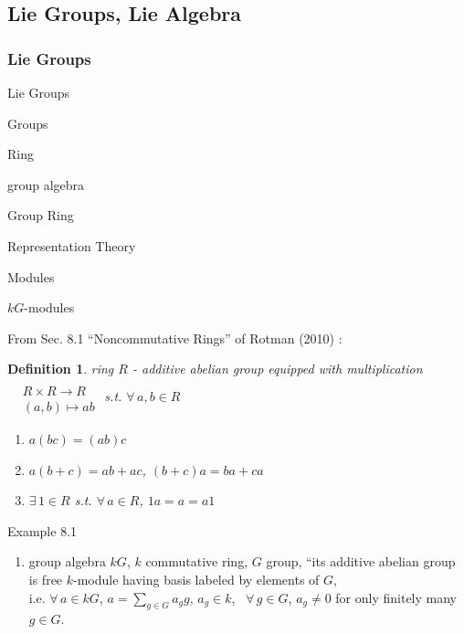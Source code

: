 \documentclass[10pt]{amsart}
\newtheorem{definition}{Definition}
\begin{document}
\begin{multicols*}{2}
\part{Lie Groups, Lie Algebra}

\section{Lie Groups}

\begin{description}
	\item Lie Groups 
	\item Groups
	\item Ring
	\item group algebra
	\item Group Ring
	\item Representation Theory
	\item Modules
	\item $kG$-modules
\end{description}

From Sec. 8.1 ``Noncommutative Rings'' of Rotman (2010) \cite{JRotman2010}:

\begin{definition}
	ring $R$ - additive abelian group equipped with multiplication $\begin{aligned} & \quad \\ 
	& R \times R \to R \\
	& (a,b) \mapsto ab \end{aligned}$ s.t. $\forall \, a ,b \in R$
	
	\begin{enumerate}
		\item[(i)] $a(bc) = (ab)c$ 
		\item[(ii)] $a(b+c) = ab+ ac$, $(b+c)a = ba + ca$ 
		\item[(iii)] $\exists \, 1 \in R$ s.t. $\forall \, a \in R$, $1a = a = a1$
	\end{enumerate}
\end{definition}

Example 8.1\cite{JRotman2010}
\begin{enumerate}
	\item[(ii)] group algebra $kG$, $k$ commutative ring, $G$ group, ``its additive abelian group is free $k$-module having basis labeled by elements of $G$, \\
	i.e. $\forall \, a \in kG$, $a = \sum_{g\in G} a_g g$, $a_g \in k$, \, $\forall \, g \in G$, $a_g \neq 0$ for only finitely many $g\in G$.  
	

\end{enumerate}
\end{multicols*}
\end{document}
